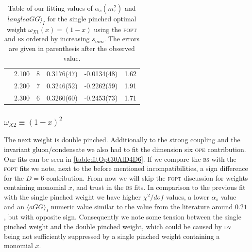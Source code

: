 \documentclass[../../index.tex]{subfiles}
\begin{document}
\begin{table}
\begin{tabularx}{\textwidth}{ccYYYY}
    & 2.100 & 8 & 0.3176(47) & -0.0134(48) & 1.62 \\
    & 2.200 & 7 & 0.3246(52) & -0.2262(59) & 1.91 \\
    & 2.300 & 6 & 0.3260(60) & -0.2453(73) & 1.71 \\
    \bottomrule
  \end{tabularx}
  \caption{Table of our fitting values of \(\alpha_s(m_\tau^2)\) and \(langle
    aGG \rangle_I\) for the single pinched optimal weight
    \(\omega_{X1}(x)=(1-x)\) using the \textsc{fopt} and \textsc{bs} ordered by
    increasing \(s_{min}\). The errors are given in parenthesis after the
    observed value.}
  \label{table:fitOpt10AlD4}
\end{table}


\subsubsection{\(\omega_{X2} \equiv (1-x)^2\)}
The next weight is double pinched. Additionally to the strong coupling and the
invariant gluon\-/condensate we also had to fit the dimension six \textsc{ope}
contribution. Our fits can be seen in \cref{table:fitOpt30AlD4D6}. If we compare
the \textsc{bs} with the \textsc{fopt} fits we note, next to the before
mentioned incompatibilities, a sign difference for the \(D=6\) contribution.
From now we will skip the \textsc{fopt} discussion for weights containing
monomial \(x\), and trust in the \textsc{bs} fits. In comparison to the previous
fit with the single pinched weight we have higher \(\chi^2/dof\) values, a lower
\(\alpha_s\) value and an \(\langle aGG \rangle_I\) numeric value similar to the
value from the literature around \(0.21\), but with opposite sign. Consequently
we note some tension between the single pinched weight and the double pinched
weight, which could be caused by \textsc{dv} being not sufficiently suppressed
by a single pinched weight containing a monomial \(x\).
\end{document}
